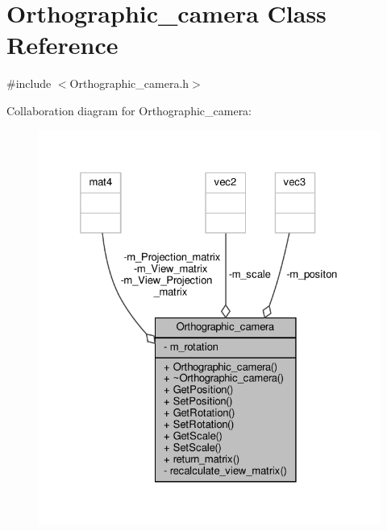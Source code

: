 \hypertarget{classOrthographic__camera}{}\section{Orthographic\+\_\+camera Class Reference}
\label{classOrthographic__camera}


{\ttfamily \#include $<$Orthographic\+\_\+camera.\+h$>$}



Collaboration diagram for Orthographic\+\_\+camera\+:
\nopagebreak
\begin{figure}[H]
\begin{center}
\leavevmode
\includegraphics[width=325pt]{classOrthographic__camera__coll__graph}
\end{center}
\end{figure}
